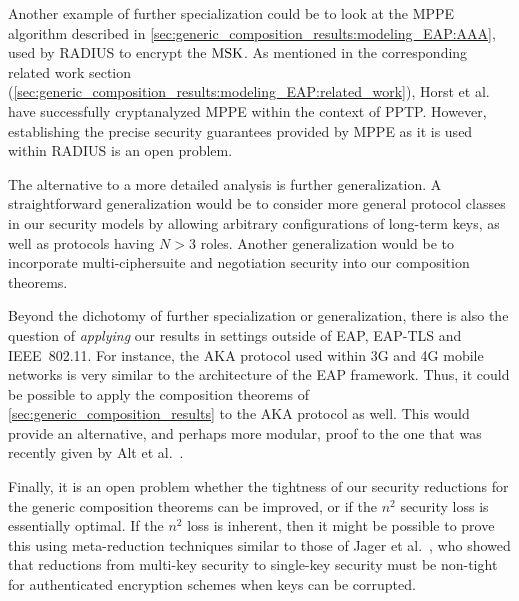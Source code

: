 Another example of further specialization could be to look at the MPPE algorithm described in \cref{sec:generic_composition_results:modeling_EAP:AAA},
used by RADIUS to encrypt the $\mathrm{MSK}$.
As mentioned in the corresponding related work section (\cref{sec:generic_composition_results:modeling_EAP:related_work}),
Horst et al.~\cite{CANS:HGJS16} have successfully cryptanalyzed MPPE within the context of PPTP.
However,
establishing the precise security guarantees provided by MPPE as it is used within RADIUS is an open problem.  
 



The alternative to a more detailed analysis is further generalization.
A straightforward generalization would be to consider more general protocol classes in our security models
by allowing arbitrary configurations of long-term keys,
as well as protocols having $N > 3$ roles.
Another generalization would be to incorporate multi-ciphersuite and negotiation security into our composition theorems.

Beyond the dichotomy of further specialization or generalization,
there is also the question of \emph{applying} our results in settings outside of EAP, EAP-TLS and IEEE~802.11.
For instance,
the AKA protocol used within 3G and 4G mobile networks is very similar to the architecture of the EAP framework.
Thus,
it could be possible to apply the composition theorems of \cref{sec:generic_composition_results} to the AKA protocol as well.
This would provide an alternative,
and perhaps more modular,
proof to the one that was recently given by Alt et al.~\cite{ACNS:AFMOR16}.


Finally,
it is an open problem whether the tightness of our security reductions for the generic composition theorems can be improved,
or if  the $n^2$ security loss is essentially optimal.
If the $n^2$ loss is inherent,
then it might be possible to prove this using meta-reduction techniques similar to those of Jager et al.~\cite{EPRINT:JSSW17},
who showed that reductions from multi-key security to single-key security must be non-tight for authenticated encryption schemes when keys can be corrupted.  
 
 
 
 
 
 
 

